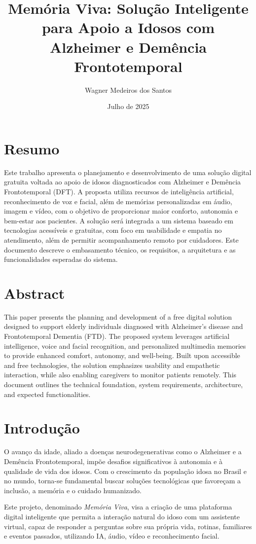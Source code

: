 \documentclass[12pt]{article}
\title{Memória Viva: Solução Inteligente para Apoio a Idosos com Alzheimer e Demência Frontotemporal}
\author{Wagner Medeiros dos Santos}
\date{Julho de 2025}
\begin{document}
\maketitle

\section*{Resumo}
Este trabalho apresenta o planejamento e desenvolvimento de uma solução digital gratuita voltada ao apoio de idosos diagnosticados com Alzheimer e Demência Frontotemporal (DFT). A proposta utiliza recursos de inteligência artificial, reconhecimento de voz e facial, além de memórias personalizadas em áudio, imagem e vídeo, com o objetivo de proporcionar maior conforto, autonomia e bem-estar aos pacientes. A solução será integrada a um sistema baseado em tecnologias acessíveis e gratuitas, com foco em usabilidade e empatia no atendimento, além de permitir acompanhamento remoto por cuidadores. Este documento descreve o embasamento técnico, os requisitos, a arquitetura e as funcionalidades esperadas do sistema.

\section*{Abstract}
This paper presents the planning and development of a free digital solution designed to support elderly individuals diagnosed with Alzheimer’s disease and Frontotemporal Dementia (FTD). The proposed system leverages artificial intelligence, voice and facial recognition, and personalized multimedia memories to provide enhanced comfort, autonomy, and well-being. Built upon accessible and free technologies, the solution emphasizes usability and empathetic interaction, while also enabling caregivers to monitor patients remotely. This document outlines the technical foundation, system requirements, architecture, and expected functionalities.

\section{Introdução}
O avanço da idade, aliado a doenças neurodegenerativas como o Alzheimer e a Demência Frontotemporal, impõe desafios significativos à autonomia e à qualidade de vida dos idosos. Com o crescimento da população idosa no Brasil e no mundo, torna-se fundamental buscar soluções tecnológicas que favoreçam a inclusão, a memória e o cuidado humanizado.

Este projeto, denominado \textit{Memória Viva}, visa a criação de uma plataforma digital inteligente que permita a interação natural do idoso com um assistente virtual, capaz de responder a perguntas sobre sua própria vida, rotinas, familiares e eventos passados, utilizando IA, áudio, vídeo e reconhecimento facial.
\end{document}

